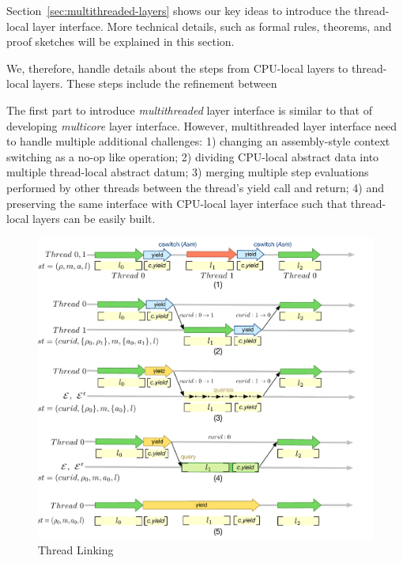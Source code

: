 Section~\ref{sec:multithreaded-layers} shows our key ideas to introduce the thread-local layer interface.
More technical details, such as formal rules, theorems, and proof sketches will be explained in this section.
We, therefore, handle details about the steps from CPU-local layers to thread-local layers. 
These steps include the refinement between 

 
The first part to introduce \emph{multithreaded} layer interface
is similar to that of developing \emph{multicore} layer interface.
However, multithreaded layer interface need to handle
multiple additional challenges:
1) changing an assembly-style context switching as a no-op like operation;
2) dividing CPU-local abstract data into multiple thread-local abstract datum; 
3) merging multiple step evaluations performed by other threads between the thread's yield call and return; 
4) and preserving the same interface with CPU-local layer interface such that thread-local layers can be easily built.

\begin{figure}[ht]
\includegraphics[scale=.30]{figs/thread-linking}
\caption{Thread Linking}
\label{fig:thread-linking}
\end{figure}

